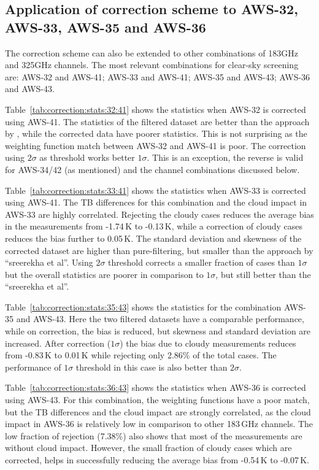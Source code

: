 \documentclass[12pt]{article}
\begin{document}
\subsection{Application of correction scheme to AWS-32, AWS-33, AWS-35 and AWS-36}
%
The correction scheme can also be extended to other combinations of 183GHz and
325GHz channels. The most relevant combinations for clear-sky screening are: AWS-32 and
AWS-41; AWS-33 and AWS-41; AWS-35 and AWS-43; AWS-36 and AWS-43.

Table~\ref{tab:correction:stats:32:41} shows the statistics when AWS-32 is
corrected using AWS-41. The statistics of the filtered dataset are better than
the approach by \cite{rekha2012potential}, while the corrected data have poorer
statistics. This is not surprising as the weighting function match between
AWS-32 and AWS-41 is poor. The correction using $2\sigma$ as threshold works
better $1\sigma$. This is an exception, the reverse is valid for AWS-34/42 (as
mentioned) and the channel combinations discussed below.

Table~\ref{tab:correction:stats:33:41} shows the statistics when AWS-33 is
corrected using AWS-41. The TB differences for this combination and the cloud
impact in AWS-33 are highly correlated. Rejecting the cloudy cases reduces the
average bias in the measurements from -1.74\,K to -0.13\,K, while a correction
of cloudy cases reduces the bias further to 0.05\,K. The standard deviation and skewness of the corrected dataset are higher than pure-filtering, but smaller than the approach by  ``sreerekha et al''. Using $2\sigma$ threshold corrects a smaller fraction of cases than $1\sigma$ but the overall statistics are poorer in comparison to $1\sigma$, but still better than the ``sreerekha et al''.

Table~\ref{tab:correction:stats:35:43} shows the statistics for the combination AWS-35 and AWS-43. Here the two filtered datasets have a comparable performance, while on correction, the bias is reduced, but skewness and standard deviation are increased. After correction ($1\sigma$) the bias due to cloudy measurements reduces from -0.83\,K to 0.01\,K while rejecting only 2.86\% of the total cases.  The performance of $1\sigma$ threshold in this case is also better than $2\sigma$.  
 
 
Table~\ref{tab:correction:stats:36:43} shows the statistics when AWS-36 is
corrected using AWS-43. For this combination, the weighting functions have a
poor match, but the TB differences and the cloud impact are strongly
correlated, as the cloud impact in AWS-36 is relatively low in comparison to
other 183\,GHz channels. The low fraction of rejection (7.38\%) also shows that
most of the measurements are without cloud impact. However, the small fraction
of cloudy cases which are corrected, helps in successfully reducing the average
bias from -0.54\,K to -0.07\,K.
\end{document}
